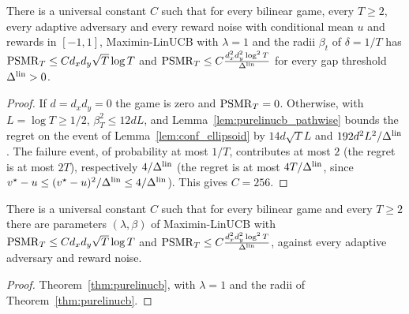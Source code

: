 \begin{theorem}[Theorem 12]
  \label{thm:purelinucb}
  \leanok
  There is a universal constant $C$ such that for every bilinear game, every $T \ge 2$, every
  adaptive adversary and every reward noise with conditional mean $u$ and rewards in $[-1, 1]$,
  Maximin-LinUCB with $\lambda = 1$ and the radii $\beta_t$ of $\delta = 1/T$ has
  $\mathrm{PSMR}_T \le C d_x d_y \sqrt T \log T$ and $\mathrm{PSMR}_T \le C \frac{d_x^2 d_y^2 \log^2 T}{\Delta^{\mathrm{lin}}}$ for
  every gap threshold $\Delta^{\mathrm{lin}} > 0$.
\end{theorem}

\begin{proof}
  \leanok
  If $d = d_x d_y = 0$ the game is zero and $\mathrm{PSMR}_T = 0$. Otherwise, with $L = \log T \ge 1/2$,
  $\beta_T^2 \le 12 d L$, and Lemma~\ref{lem:purelinucb_pathwise} bounds the regret on the event of
  Lemma~\ref{lem:conf_ellipsoid} by $14 d \sqrt T L$ and $192 d^2 L^2/\Delta^{\mathrm{lin}}$. The failure event, of
  probability at most $1/T$, contributes at most $2$ (the regret is at most $2T$), respectively
  $4/\Delta^{\mathrm{lin}}$ (the regret is at most $4T/\Delta^{\mathrm{lin}}$, since $v^\star - u \le (v^\star - u)^2/\Delta^{\mathrm{lin}} \le
  4/\Delta^{\mathrm{lin}}$). This gives $C = 256$.
\end{proof}

\begin{theorem}[Theorem 6]
  \label{thm:purelinucb_informal}
  \leanok
  There is a universal constant $C$ such that for every bilinear game and every $T \ge 2$ there are
  parameters $(\lambda, \beta)$ of Maximin-LinUCB with $\mathrm{PSMR}_T \le C d_x d_y \sqrt T \log T$ and
  $\mathrm{PSMR}_T \le C \frac{d_x^2 d_y^2 \log^2 T}{\Delta^{\mathrm{lin}}}$, against every adaptive adversary and reward
  noise.
\end{theorem}

\begin{proof}
  \leanok
  Theorem~\ref{thm:purelinucb}, with $\lambda = 1$ and the radii of Theorem~\ref{thm:purelinucb}.
\end{proof}
